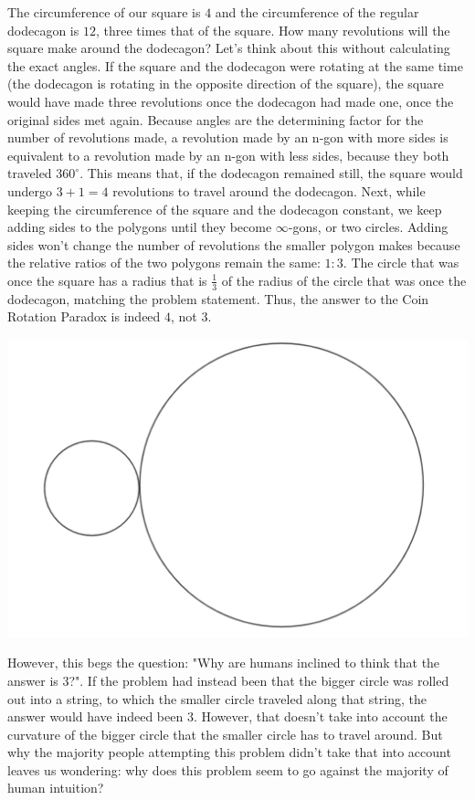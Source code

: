 \documentclass{article}
\begin{document}
The circumference of our square is $4$ and the circumference of the regular dodecagon is $12$, three times that of the square. How many revolutions will the square make around the dodecagon? Let's think about this without calculating the exact angles. If the square and the dodecagon were rotating at the same time (the dodecagon is rotating in the opposite direction of the square), the square would have made three revolutions once the dodecagon had made one, once the original sides met again. Because angles are the determining factor for the number of revolutions made, a revolution made by an n-gon with more sides is equivalent to a revolution made by an n-gon with less sides, because they both traveled $360^{\circ}$. This means that, if the dodecagon remained still, the square would undergo $3+1=4$ revolutions to travel around the dodecagon. Next, while keeping the circumference of the square and the dodecagon constant, we keep adding sides to the polygons until they become $\infty$-gons, or two circles. Adding sides won't change the number of revolutions the smaller polygon makes because the relative ratios of the two polygons remain the same: $1:3$. The circle that was once the square has a radius that is $\frac{1}{3}$ of the radius of the circle that was once the dodecagon,  matching the problem statement. Thus, the answer to the Coin Rotation Paradox is indeed $4$, not $3$.

\begin{center}
\includegraphics[scale=0.5]{images/weincreasethesidestoinfinity.png}
\end{center}

However, this begs the question: "Why are humans inclined to think that the answer is $3$?". If the problem had instead been that the bigger circle was rolled out into a string, to which the smaller circle traveled along that string, the answer would have indeed been $3$. However, that doesn't take into account the curvature of the bigger circle that the smaller circle has to travel around. But why the majority people attempting this problem didn't take that into account leaves us wondering: why does this problem seem to go against the majority of human intuition? 
\end{document}
